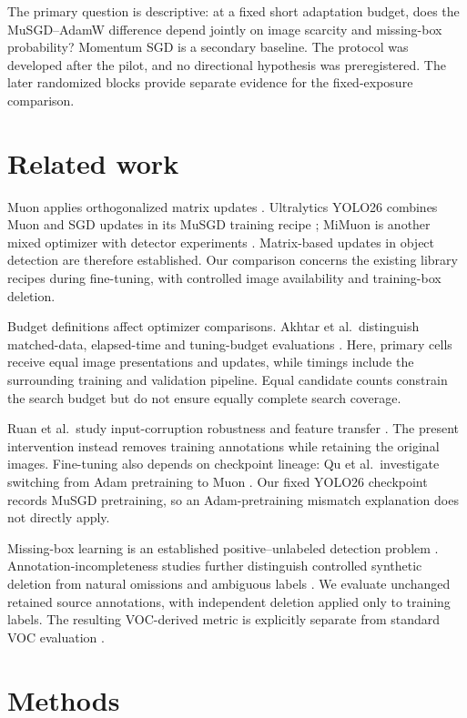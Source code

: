 \documentclass[11pt,a4paper]{article}
\begin{document}
The primary question is descriptive: at a fixed short adaptation budget, does the MuSGD--AdamW difference depend jointly on image scarcity and missing-box probability? Momentum SGD is a secondary baseline. The protocol was developed after the pilot, and no directional hypothesis was preregistered. The later randomized blocks provide separate evidence for the fixed-exposure comparison.

\section{Related work}
Muon applies orthogonalized matrix updates \cite{jordan2024}. Ultralytics YOLO26 combines Muon and SGD updates in its MuSGD training recipe \cite{jocher2026}; MiMuon is another mixed optimizer with detector experiments \cite{huang2026}. Matrix-based updates in object detection are therefore established. Our comparison concerns the existing library recipes during fine-tuning, with controlled image availability and training-box deletion.

Budget definitions affect optimizer comparisons. Akhtar et al.\ distinguish matched-data, elapsed-time and tuning-budget evaluations \cite{akhtar2026}. Here, primary cells receive equal image presentations and updates, while timings include the surrounding training and validation pipeline. Equal candidate counts constrain the search budget but do not ensure equally complete search coverage.

Ruan et al.\ study input-corruption robustness and feature transfer \cite{ruan2026}. The present intervention instead removes training annotations while retaining the original images. Fine-tuning also depends on checkpoint lineage: Qu et al.\ investigate switching from Adam pretraining to Muon \cite{qu2026}. Our fixed YOLO26 checkpoint records MuSGD pretraining, so an Adam-pretraining mismatch explanation does not directly apply.

Missing-box learning is an established positive--unlabeled detection problem \cite{yang2020}. Annotation-incompleteness studies further distinguish controlled synthetic deletion from natural omissions and ambiguous labels \cite{penquitt2026}. We evaluate unchanged retained source annotations, with independent deletion applied only to training labels. The resulting VOC-derived metric is explicitly separate from standard VOC evaluation \cite{everingham2010}.

\section{Methods}
\end{document}
